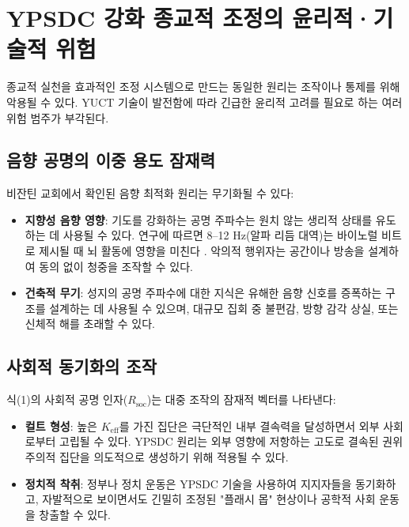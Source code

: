 \documentclass[12pt,a4paper]{article}
\begin{document}
	\section{YPSDC 강화 종교적 조정의 윤리적·기술적 위험}
	\label{sec:risks}
	
	종교적 실천을 효과적인 조정 시스템으로 만드는 동일한 원리는 조작이나 통제를 위해 악용될 수 있다. YUCT 기술이 발전함에 따라 긴급한 윤리적 고려를 필요로 하는 여러 위험 범주가 부각된다.
	
	\subsection{음향 공명의 이중 용도 잠재력}
	
	비잔틴 교회에서 확인된 음향 최적화 원리는 무기화될 수 있다:
	\begin{itemize}
		\item \textbf{지향성 음향 영향}: 기도를 강화하는 공명 주파수는 원치 않는 생리적 상태를 유도하는 데 사용될 수 있다. 연구에 따르면 8–12 Hz(알파 리듬 대역)는 바이노럴 비트로 제시될 때 뇌 활동에 영향을 미친다 \cite{Garcia2021}. 악의적 행위자는 공간이나 방송을 설계하여 동의 없이 청중을 조작할 수 있다.
		
		\item \textbf{건축적 무기}: 성지의 공명 주파수에 대한 지식은 유해한 음향 신호를 증폭하는 구조를 설계하는 데 사용될 수 있으며, 대규모 집회 중 불편감, 방향 감각 상실, 또는 신체적 해를 초래할 수 있다.
	\end{itemize}
	
	\subsection{사회적 동기화의 조작}
	
	식(1)의 사회적 공명 인자($R_{\mathrm{soc}}$)는 대중 조작의 잠재적 벡터를 나타낸다:
	\begin{itemize}
		\item \textbf{컬트 형성}: 높은 $K_{\mathrm{eff}}$를 가진 집단은 극단적인 내부 결속력을 달성하면서 외부 사회로부터 고립될 수 있다. YPSDC 원리는 외부 영향에 저항하는 고도로 결속된 권위주의적 집단을 의도적으로 생성하기 위해 적용될 수 있다.
		
		\item \textbf{정치적 착취}: 정부나 정치 운동은 YPSDC 기술을 사용하여 지지자들을 동기화하고, 자발적으로 보이면서도 긴밀히 조정된 "플래시 몹" 현상이나 공학적 사회 운동을 창출할 수 있다.
	\end{itemize}
	
\end{document}
